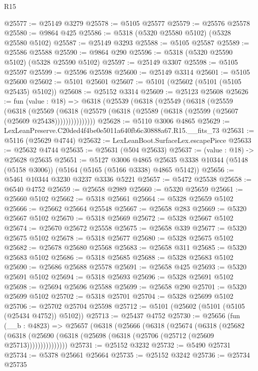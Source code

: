 \begin{lexlean}{R15}
\begin{coremodule}
{{{{{{{{{{{@25577 := @25149 @3279
@25578 := @5105 @25577
@25579 := @25576 @25578
@25580 := @9864 @425
@25586 := @5318 (@5320 @25580 @5102) (@5328 @25580 @5102)
@25587 := @25149 @3293
@25588 := @5105 @25587
@25589 := @25586 @25588
@25590 := @9864 @290
@25596 := @5318 (@5320 @25590 @5102) (@5328 @25590 @5102)
@25597 := @25149 @3307
@25598 := @5105 @25597
@25599 := @25596 @25598
@25600 := @25149 @3314
@25601 := @5105 @25600
@25602 := @5101 @25601
@25607 := @5101 (@25602 (@5101 (@5105 @25435) @5102))
@25608 := @25152 @3314
@25609 := @25123 @25608
@25626 := fun (value : @18) =>
  @6318
    (@25539
      (@6318
        (@25549
          (@6318
            (@25559
              (@6318
                (@25569
                  (@6318 (@25579 (@6318 (@25589 (@6318 (@25599 (@25607 (@25609 @25438)))))))))))))))
@25628 := @5110 @3006 @4865
@25629 := LexLeanPreserve.C20ded4f4be0e5011a640fb6c30888a67.R15.__fits_73
@25631 := @5116 (@25629 @4744)
@25632 := LexLeanBoot.SurfaceLex.escapePiece
@25633 := @25632 @4744
@25635 := @25631 (@504 @25633)
@25637 := (value : @18) -> @25628 @25635
@25651 := @5127
    @3006
    @4865
    @25635
    @3338
    @10344
    (@5148 (@5158 @3006))
    (@5164 (@5165 (@5166 @3338) @4865 @5142))
@25656 := @5461 @10344 @3230 @3237 @3336 @5221
@25657 := @5472 @25538
@25658 := @6540 @4752
@25659 := @25658 @2989
@25660 := @5320 @25659
@25661 := @25660 @5102
@25662 := @5318 @25661
@25664 := @5328 @25659 @5102
@25666 := @25662 @25664 @25548
@25667 := @25658 @283
@25669 := @5320 @25667 @5102
@25670 := @5318 @25669
@25672 := @5328 @25667 @5102
@25674 := @25670 @25672 @25558
@25675 := @25658 @339
@25677 := @5320 @25675 @5102
@25678 := @5318 @25677
@25680 := @5328 @25675 @5102
@25682 := @25678 @25680 @25568
@25683 := @25658 @311
@25685 := @5320 @25683 @5102
@25686 := @5318 @25685
@25688 := @5328 @25683 @5102
@25690 := @25686 @25688 @25578
@25691 := @25658 @425
@25693 := @5320 @25691 @5102
@25694 := @5318 @25693
@25696 := @5328 @25691 @5102
@25698 := @25694 @25696 @25588
@25699 := @25658 @290
@25701 := @5320 @25699 @5102
@25702 := @5318 @25701
@25704 := @5328 @25699 @5102
@25706 := @25702 @25704 @25598
@25712 := @5101 (@25602 (@5101 (@5105 (@25434 @4752)) @5102))
@25713 := @25437 @4752
@25730 := @25656
    (fun (__b : @4823) =>
    @25657
      (@6318
        (@25666
          (@6318
            (@25674
              (@6318
                (@25682
                  (@6318 (@25690 (@6318 (@25698 (@6318 (@25706 (@25712 (@25609 @25713)))))))))))))))
@25731 := @25152 @3232
@25732 := @5490 @25731
@25734 := @5378 @25661 @25664
@25735 := @25152 @3242
@25736 := @25734 @25735
}}}}}}}}}}}
\end{coremodule}
\end{lexlean}
